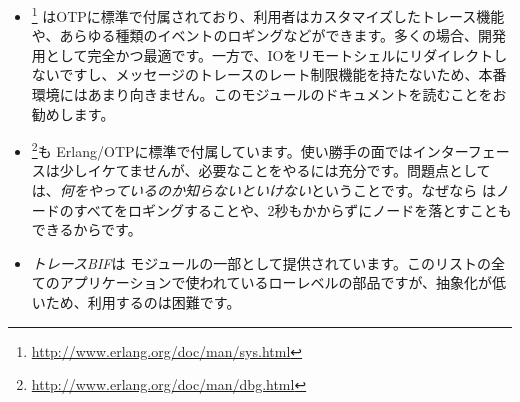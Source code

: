 \begin{itemize}
	\item {}\footnote{\href{http://www.erlang.org/doc/man/sys.html}{http://www.erlang.org/doc/man/sys.html}} はOTPに標準で付属されており、利用者はカスタマイズしたトレース機能や、あらゆる種類のイベントのロギングなどができます。多くの場合、開発用として完全かつ最適です。一方で、IOをリモートシェルにリダイレクトしないですし、メッセージのトレースのレート制限機能を持たないため、本番環境にはあまり向きません。このモジュールのドキュメントを読むことをお勧めします。

\item {}\footnote{\href{http://www.erlang.org/doc/man/dbg.html}{http://www.erlang.org/doc/man/dbg.html}}も Erlang/OTPに標準で付属しています。使い勝手の面ではインターフェースは少しイケてませんが、必要なことをやるには充分です。問題点としては、\emph{何をやっているのか知らないといけない}ということです。なぜなら  はノードのすべてをロギングすることや、2秒もかからずにノードを落とすこともできるからです。

	\item \emph{トレースBIF}は モジュールの一部として提供されています。このリストの全てのアプリケーションで使われているローレベルの部品ですが、抽象化が低いため、利用するのは困難です。


\end{itemize}
